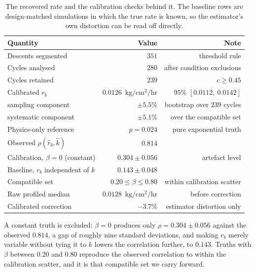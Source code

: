 \documentclass[runningheads]{llncs}
\newcommand{\ratu}{\ensuremath{\mathrm{kg/cm^{2}/hr}}}
\newcommand{\rb}{\ensuremath{r_{b}}}
\newcommand{\rbh}{\ensuremath{\hat{r}_{b}}}
\newcommand{\kh}{\ensuremath{\hat{k}}}
\begin{document}
\begin{table}[t]
\caption{The recovered rate and the calibration checks behind it. The
baseline rows are design-matched simulations in which the true rate is
known, so the estimator's own distortion can be read off directly.}
\label{tab:rate}
\centering
\begin{tabular}{lrr}
\toprule
Quantity & Value & Note \\
\midrule
Descents segmented & $351$ & threshold rule \\
Cycles analysed & $280$ & after condition exclusions \\
Cycles retained & $239$ & $c \ge 0.45$ \\
Calibrated \rb{} & $0.0126$~\ratu{} & $95\%$ $[0.0112,\ 0.0142]$ \\
\quad sampling component & $\pm 5.5\%$ & bootstrap over $239$ cycles \\
\quad systematic component & $\pm 5.1\%$ & over the compatible set \\
Physics-only reference & $p=0.024$ & pure exponential truth \\
\midrule
Observed $\rho(\rbh,\kh)$ & $0.814$ & \\
Calibration, $\beta=0$ (constant) & $0.304 \pm 0.056$ & artefact level \\
Baseline, \rb{} independent of $k$ & $0.143 \pm 0.048$ & \\
Compatible set & $0.20 \le \beta \le 0.80$ & within calibration scatter \\
\midrule
Raw profiled median & $0.0128$~\ratu{} & before correction \\
Calibrated correction & $-3.7\%$ & estimator distortion only \\
\bottomrule
\end{tabular}
\end{table}

A constant truth is excluded: $\beta=0$ produces only
$\rho=0.304 \pm 0.056$ against the observed $0.814$, a gap of roughly
nine standard deviations, and making \rb{} merely variable without
tying it to $k$ lowers the correlation further, to $0.143$. Truths
with $\beta$ between $0.20$ and $0.80$ reproduce the observed
correlation to within the calibration scatter, and it is that
compatible set we carry forward.
\end{document}
